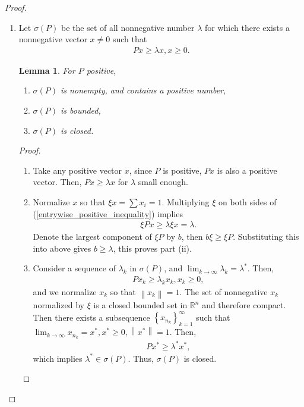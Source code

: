 \documentclass[11pt]{book}
\newtheorem{lemma}[theorem]{Lemma}
\theoremstyle{definition}
\numberwithin{equation}{chapter}
\begin{document}
\begin{proof}
~\begin{enumerate}[label=(\alph*)]
    \item Let $\sigma(P)$ be the set of all nonnegative number $\lambda$ for which there exists a nonnegative vector $x \neq 0$ such that
    \begin{align}\label{entrywise_positive_inequality}
        Px \geq \lambda x, x \geq 0.
    \end{align}
    
    \begin{lemma}
    For $P$ positive, 
    \begin{enumerate}[label=(\roman*)]
        \item $\sigma(P)$ is nonempty, and contains a positive number,
        
        \item $\sigma(P)$ is bounded,
        
        \item $\sigma(P)$ is closed.
    \end{enumerate}
    \end{lemma}
    \begin{proof}
    ~\begin{enumerate}[label=(\roman*)]
        \item Take any positive vector $x$, since $P$ is positive, $Px$ is also a positive vector. Then, $Px \geq \lambda x$ for $\lambda$ small enough.
        
        \item Normalize $x$ so that $\xi x = \sum x_i = 1$. Multiplying $\xi$ on both sides of (\ref{entrywise_positive_inequality}) implies
        \begin{align*}
            \xi Px \geq \lambda \xi x = \lambda.
        \end{align*}
        Denote the largest component of $\xi P$ by $b$, then $b \xi \geq \xi P$. Substituting this into above gives $b \geq \lambda$, this proves part (ii).
        
        \item Consider a sequence of $\lambda_k$ in $\sigma(P)$, and $\lim_{k\to\infty} \lambda_k = \lambda^*$. Then,
        \begin{align*}
            Px_k \geq \lambda_k x_k, x_k \geq 0,
        \end{align*}
        and we normalize $x_k$ so that $\left\|x_k\right\| = 1$. The set of nonnegative $x_k$ normalized by $\xi$ is a closed bounded set in $\mathbb{R}^n$ and therefore compact. Then there exists a subsequence $\left\{x_{n_k}\right\}^\infty_{k=1}$ such that $\lim_{k\to\infty} x_{n_k} = x^*, x^* \geq 0, \left\|x^*\right\| = 1$. Then,
        \begin{align*}
            P x^* \geq \lambda^* x^*,
        \end{align*}
        which implies $\lambda^* \in \sigma(P)$. Thus, $\sigma(P)$ is closed.
     \end{enumerate}
    \end{proof}
    

\end{enumerate}
\end{proof}
\end{document}
